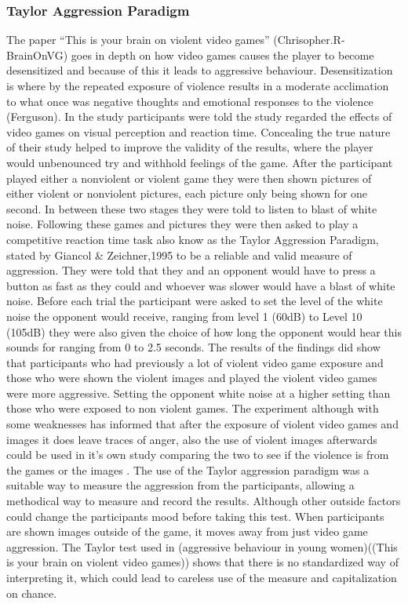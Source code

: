 \documentclass[journal]{IEEEtran}
\begin{document}
    \subsubsection{Taylor Aggression Paradigm}
        The paper “This is your brain on violent video games” (Chrisopher.R-BrainOnVG) goes in depth on how video games causes the player to become desensitized and because of this it leads to aggressive behaviour. Desensitization is where by the repeated exposure of violence results in a moderate acclimation to what once was negative thoughts and emotional responses to the violence (Ferguson). In the study participants were told the study regarded the effects of video games on visual perception and reaction time. Concealing the true nature of their study helped to improve the validity of the results, where the player would unbenounced try and withhold feelings of the game. After the participant played either a nonviolent or violent game they were then shown pictures of either violent or nonviolent pictures, each picture only being shown for one second. In between these two stages they were told to listen to blast of white noise. Following these games and pictures they were then asked to play a competitive reaction time task also know as the Taylor Aggression Paradigm, stated by Giancol \& Zeichner,1995 to be a reliable and valid measure of aggression. They were told that they and an opponent would have to press a button as fast as they could and whoever was slower would have a blast of white noise. Before each trial the participant were asked to set the level of the white noise the opponent would receive, ranging from level 1 (60dB) to Level 10 (105dB) they were also given the choice of how long the opponent would hear this sounds for ranging from 0 to 2.5 seconds. The results of the findings did show that participants who had previously a lot of violent video game exposure and those who were shown the violent images and played the violent video games were more aggressive. Setting the opponent white noise at a higher setting than those who were exposed to non violent games. The experiment although with some weaknesses has informed that after the exposure of violent video games and images it does leave traces of anger, also the use of violent images afterwards could be used in it’s own study comparing the two to see if the violence is from the games or the images . The use of the Taylor aggression paradigm was a suitable way to measure the aggression from the participants, allowing a methodical way to measure and record the results. Although other outside factors could change the participants mood before taking this test. When participants are shown images outside of the game, it moves away from just video game aggression. The Taylor test used in (aggressive behaviour in young women)((This is your brain on violent video games)) shows that there is no standardized way of interpreting it, which could lead to careless use of the measure and capitalization on chance.
\end{document}
